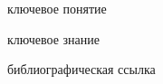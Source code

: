 \begin{SCn}

\bigskip

\begin{scnrelfromlist}{ключевое понятие}
\end{scnrelfromlist}

\bigskip

\begin{scnrelfromlist}{ключевое знание}
\end{scnrelfromlist}

\bigskip

\begin{scnrelfromlist}{библиографическая ссылка}
\end{scnrelfromlist}

\end{SCn}    
